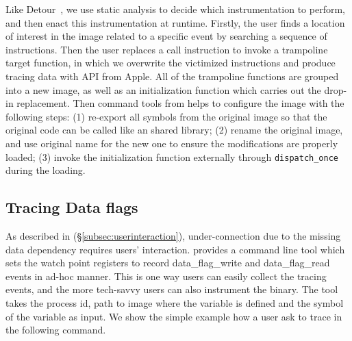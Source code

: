 Like Detour~\cite{hunt1999detours}, we use static analysis to decide which
instrumentation to perform, and then enact this instrumentation at runtime.
Firstly, the user finds a location of interest in the image related to a
specific event by searching a sequence of instructions. Then the user replaces a
call instruction to invoke a trampoline target function, in which we overwrite
the victimized instructions and produce tracing data with API from Apple.
All of the trampoline functions are grouped into a new image, as well as an
initialization function which carries out the drop-in replacement. Then command
tools from \xxx helps to configure the image with the following steps: (1)
re-export all symbols from the original image so that the original code can be
called like an shared library; (2) rename the original image, and use original
name for the new one to ensure the modifications are properly loaded; (3) invoke
the initialization function externally through \texttt{dispatch\_once} during
the loading.



\subsection{Tracing Data flags} \label{subsec:tcp}
As described in (\S\ref{subsec:userinteraction}), under-connection due
to the missing data dependency requires users' interaction. \xxx
provides a command line tool which sets the watch point registers to record
data\_flag\_write and data\_flag\_read events in ad-hoc manner. This is one
way users can easily collect the tracing events, and the more tech-savvy users
can also instrument the binary. The tool takes the process id, path to image
where the variable is defined and the symbol of the variable as input. We
show the simple example how a user ask \xxx to trace  in the
following command.

